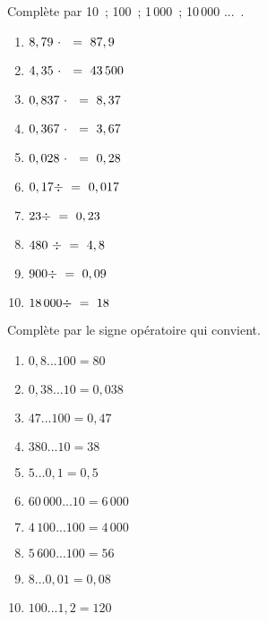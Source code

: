 \begin{exercice}
Complète par 10 ; 100 ; 1\,000 ; 10\,000 ... .
\begin{enumerate} 
 \item $8,79 \cdot \dotfill = 87,9$ \hspace*{11em}
 
 \item $4,35 \cdot \dotfill = 43\,500$ \hspace*{11em}
 
 \item $0,837 \cdot \dotfill = 8,37$ \hspace*{11em}
 
 \item $0,367 \cdot \dotfill = 3,67$ \hspace*{11em}
 
 \item $0,028 \cdot \dotfill = 0,28$ \hspace*{11em}
 
 \item $0,17 \div \dotfill = 0,017$ \hspace*{11em}
 
 \item $23 \div \dotfill = 0,23$ \hspace*{11em}
 
 \item $480 \div \dotfill = 4,8$ \hspace*{11em}
 
 \item $900 \div \dotfill = 0,09$ \hspace*{11em}
 
 \item \hspace{0.25em}$18\,000 \div \dotfill = 18$ \hspace*{11em}
 
 \end{enumerate}
\end{exercice}


\begin{exercice}
Complète par le signe opératoire qui convient.
\begin{enumerate} 
 \item $0,8 ... 100 = 80$
 \item $0,38 ... 10 = 0,038$
 \item $47 ... 100 = 0,47$
 \item $380 ... 10 = 38$
 \item $5 ... 0,1 = 0,5$
 \item $60\,000 ... 10 = 6\,000$
 \item $4\,100 ... 100 = 4\,000$
 \item $5\,600 ... 100 = 56$
 \item $8 ... 0,01 = 0,08$
 \item \hspace{0.25em}$100 ... 1,2 = 120$
 \end{enumerate} 
\end{exercice}



